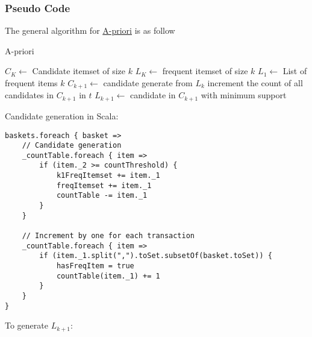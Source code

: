 \documentclass[11pt]{article}
\begin{document}
\subsubsection {Pseudo Code}
The general algorithm for \href{https://www3.cs.stonybrook.edu/~cse634/lecture_notes/07apriori.pdf}{A-priori} is as follow \\

\begin{algorithm}[H]
    \caption{A-priori}

    \begin{algorithmic}[1]
        \State $C_K \gets $ Candidate itemset of size $k$
        \State $L_K \gets $ frequent itemset of size $k$
        \State
        \State $L_1 \gets $ List of frequent items $k$
        \State
            \State $C_{k+1} \gets $ candidate generate from $L_k$
                \State increment the count of all candidates in $C_{k+1}$ in $t$
            \EndFor
            \State $L_{k+1} \gets$ candidate in $C_{k+1}$ with minimum support
        \EndFor
    \end{algorithmic}
\end{algorithm}

Candidate generation in Scala: \\

\begin{lstlisting}
baskets.foreach { basket =>
    // Candidate generation
    _countTable.foreach { item =>
        if (item._2 >= countThreshold) {
            k1FreqItemset += item._1
            freqItemset += item._1
            countTable -= item._1
        }
    }

    // Increment by one for each transaction
    _countTable.foreach { item =>
        if (item._1.split(",").toSet.subsetOf(basket.toSet)) {
            hasFreqItem = true
            countTable(item._1) += 1
        }
    }
}
\end{lstlisting}

To generate $L_{k+1}$: \\
\end{document}
